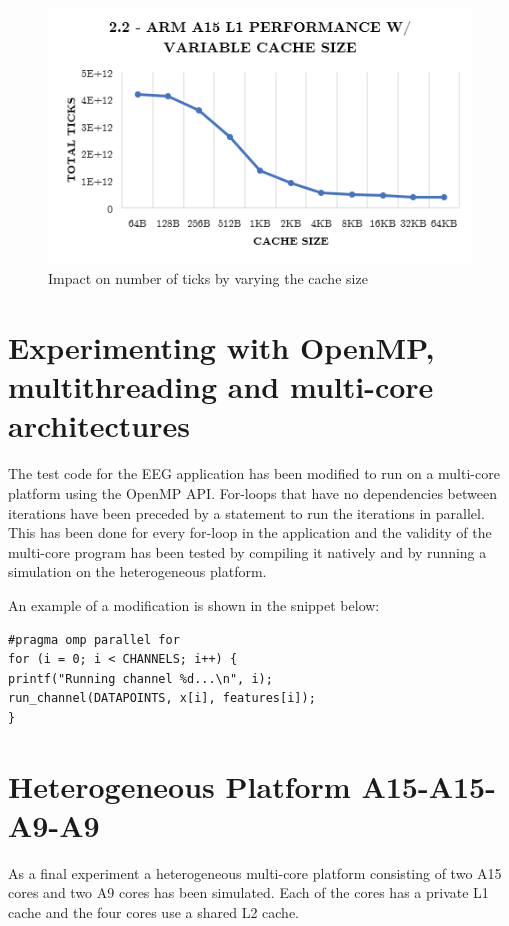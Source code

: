 \documentclass[a4paper, 10pt, conference]{ieeeconf}      %
\begin{document}
\begin{figure}[thpb]
\centering
\includegraphics[scale=.5]{ex2_2.png}
\caption{Impact on number of ticks by varying the cache size}
\label{figure2_2}
\end{figure}

\section{Experimenting with OpenMP, multithreading and multi-core architectures}

The test code for the EEG application has been modified to run on a multi-core platform using the OpenMP API. For-loops that have no dependencies between iterations have been preceded by a statement to run the iterations in parallel. This has been done for every for-loop in the application and the validity of the multi-core program has been tested by compiling it natively and by running a simulation on the heterogeneous platform.

An example of a modification is shown in the snippet below:

\begin{lstlisting}
#pragma omp parallel for
for (i = 0; i < CHANNELS; i++) {
printf("Running channel %d...\n", i);
run_channel(DATAPOINTS, x[i], features[i]);
}
\end{lstlisting}

\section{Heterogeneous Platform A15-A15-A9-A9}
As a final experiment a heterogeneous multi-core platform consisting of two A15 cores and two A9 cores has been simulated. Each of the cores has a private L1 cache and the four cores use a shared L2 cache.
\end{document}
